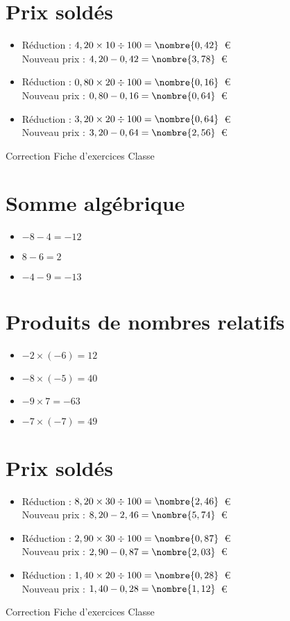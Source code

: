 \documentclass[a4paper,11pt,fleqn]{article}
\begin{document}
\section{Prix soldés}
\begin{itemize}

  \item Réduction : $4,20\times10\div100=\nombre{0,42}$~€\\
  Nouveau prix : $4,20-0,42=\nombre{3,78}$~€
  \item Réduction : $0,80\times20\div100=\nombre{0,16}$~€\\
  Nouveau prix : $0,80-0,16=\nombre{0,64}$~€
  \item Réduction : $3,20\times20\div100=\nombre{0,64}$~€\\
  Nouveau prix : $3,20-0,64=\nombre{2,56}$~€
\end{itemize}
\newpage
\setcounter{exo}{0}
\setcounter{section}{0}
{Correction} \hfill {\huge Fiche d'exercices } \hfill {Classe}

\section{Somme algébrique}
\begin{itemize}

  \item $-8 -4=-12$
  \item $8 -6=2$
  \item $-4 -9=-13$
\end{itemize}

\section{Produits de nombres relatifs}
\begin{itemize}

  \item $-2\times(-6)=12$
  \item $-8\times(-5)=40$
  \item $-9\times7=-63$
  \item $-7\times(-7)=49$
\end{itemize}

\section{Prix soldés}
\begin{itemize}

  \item Réduction : $8,20\times30\div100=\nombre{2,46}$~€\\
  Nouveau prix : $8,20-2,46=\nombre{5,74}$~€
  \item Réduction : $2,90\times30\div100=\nombre{0,87}$~€\\
  Nouveau prix : $2,90-0,87=\nombre{2,03}$~€
  \item Réduction : $1,40\times20\div100=\nombre{0,28}$~€\\
  Nouveau prix : $1,40-0,28=\nombre{1,12}$~€
\end{itemize}
\newpage
\setcounter{exo}{0}
\setcounter{section}{0}
{Correction} \hfill {\huge Fiche d'exercices } \hfill {Classe}
\end{document}
